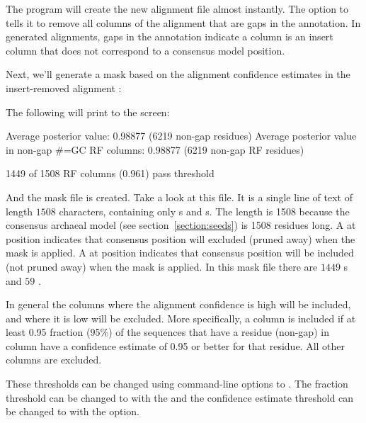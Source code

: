 The program will create the new alignment file
 almost instantly. 
The  option to  tells it to remove all
columns of the alignment that are gaps in the 
annotation. In  generated alignments, gaps in the
 annotation indicate a column is an insert column that
does not correspond to a consensus model position.

Next, we'll generate a mask based on the alignment confidence estimates
in the insert-removed alignment :


The following will print to the screen:

\begin{sreoutput}
Average posterior value:                            0.98877 (6219 non-gap residues)
Average posterior value in non-gap #=GC RF columns: 0.98877 (6219 non-gap RF residues)

1449 of 1508 RF columns (0.961) pass threshold
\end{sreoutput}

And the mask file  is created. Take a look at this
file. It is a single line of text of length $1508$ characters,
containing only s and s. The length is 1508 because
the consensus archaeal model (see section~\ref{section:seeds}) is 1508 residues
long. A  at position  indicates that consensus position 
will excluded (pruned away) when the mask is applied. A  at
position  indicates that consensus position  will be included (not
pruned away) when the mask is applied. In this mask file there are
$1449$ s and $59$ .

In general the columns where the alignment confidence is high will be
included, and where it is low will be excluded. More specifically, a
column  is included if at least 0.95 fraction (95\%)
of the sequences that have a residue (non-gap) in column  have a
confidence estimate of 0.95 or better for that residue. All other
columns are excluded.

These thresholds can be changed using command-line options to 
. The fraction threshold can be changed to
 with the  and the confidence estimate
threshold can be changed to  with the 
option.

